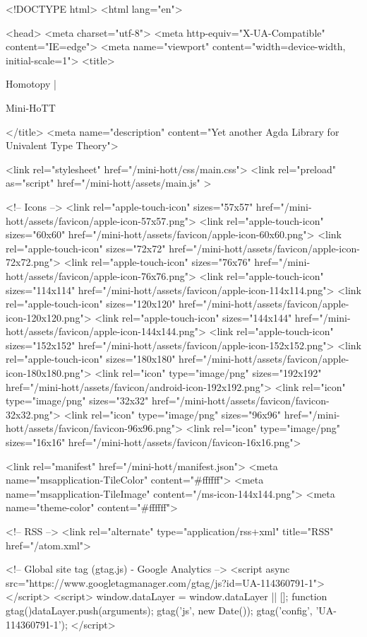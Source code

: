 <!DOCTYPE html>
<html lang="en">

<head>
  <meta charset="utf-8">
  <meta http-equiv="X-UA-Compatible" content="IE=edge">
  <meta name="viewport" content="width=device-width, initial-scale=1">
  <title>
    
      
        Homotopy |
      
        Mini-HoTT
    
  </title>
  <meta name="description" content="Yet another Agda Library for Univalent Type Theory">

  <link rel="stylesheet" href="/mini-hott/css/main.css">
  <link rel="preload" as="script" href="/mini-hott/assets/main.js" >

  <!-- Icons -->
  <link rel="apple-touch-icon" sizes="57x57" href="/mini-hott/assets/favicon/apple-icon-57x57.png">
  <link rel="apple-touch-icon" sizes="60x60" href="/mini-hott/assets/favicon/apple-icon-60x60.png">
  <link rel="apple-touch-icon" sizes="72x72" href="/mini-hott/assets/favicon/apple-icon-72x72.png">
  <link rel="apple-touch-icon" sizes="76x76" href="/mini-hott/assets/favicon/apple-icon-76x76.png">
  <link rel="apple-touch-icon" sizes="114x114" href="/mini-hott/assets/favicon/apple-icon-114x114.png">
  <link rel="apple-touch-icon" sizes="120x120" href="/mini-hott/assets/favicon/apple-icon-120x120.png">
  <link rel="apple-touch-icon" sizes="144x144" href="/mini-hott/assets/favicon/apple-icon-144x144.png">
  <link rel="apple-touch-icon" sizes="152x152" href="/mini-hott/assets/favicon/apple-icon-152x152.png">
  <link rel="apple-touch-icon" sizes="180x180" href="/mini-hott/assets/favicon/apple-icon-180x180.png">
  <link rel="icon" type="image/png" sizes="192x192"  href="/mini-hott/assets/favicon/android-icon-192x192.png">
  <link rel="icon" type="image/png" sizes="32x32" href="/mini-hott/assets/favicon/favicon-32x32.png">
  <link rel="icon" type="image/png" sizes="96x96" href="/mini-hott/assets/favicon/favicon-96x96.png">
  <link rel="icon" type="image/png" sizes="16x16" href="/mini-hott/assets/favicon/favicon-16x16.png">

  <link rel="manifest" href="/mini-hott/manifest.json">
  <meta name="msapplication-TileColor" content="#ffffff">
  <meta name="msapplication-TileImage" content="/ms-icon-144x144.png">
  <meta name="theme-color" content="#ffffff">

  <!-- RSS -->
  <link rel="alternate" type="application/rss+xml" title="RSS" href="/atom.xml">

  <!-- Global site tag (gtag.js) - Google Analytics -->
  <script async src="https://www.googletagmanager.com/gtag/js?id=UA-114360791-1"></script>
  <script>
    window.dataLayer = window.dataLayer || [];
    function gtag(){dataLayer.push(arguments);}
    gtag('js', new Date());
    gtag('config', 'UA-114360791-1');
  </script>

